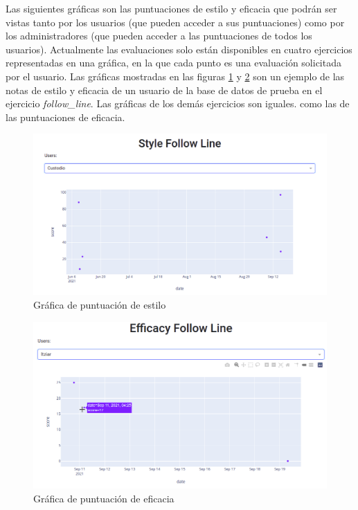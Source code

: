 Las siguientes gráficas son las puntuaciones de estilo y eficacia que podrán ser vistas tanto por los usuarios (que pueden acceder a sus puntuaciones) como por los administradores (que pueden acceder a las puntuaciones de todos los usuarios).  Actualmente las evaluaciones solo están disponibles en cuatro ejercicios representadas en una gráfica, en la que cada punto es una evaluación solicitada por el usuario. Las gráficas mostradas en las figuras \ref{fig:score} y \ref{fig:score_efficacy}  son un ejemplo de las notas de estilo y eficacia de un usuario de la base de datos de prueba en el ejercicio \textit{follow\_line}. Las gráficas de los demás ejercicios son iguales. como las de las puntuaciones de eficacia.



\begin{figure}[H]
    \centering
    \includegraphics[width=17cm, keepaspectratio]{img/score.png}
    \caption{Gráfica de puntuación de estilo}
    \label{fig:score}
\end{figure}


\begin{figure}[H]
    \centering
    \includegraphics[width=17cm, keepaspectratio]{img/score_efficacy.png}
    \caption{Gráfica de puntuación de eficacia}
    \label{fig:score_efficacy}
\end{figure}









